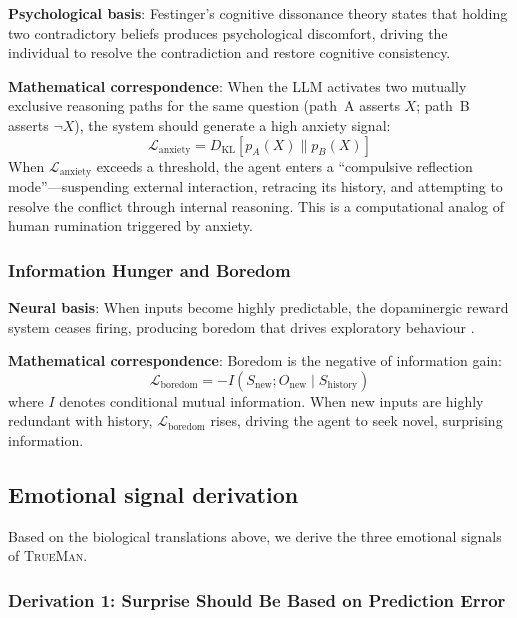 \documentclass[pdflatex,sn-mathphys-num]{sn-jnl}
\newcommand{\TrueMan}{\textsc{TrueMan}}
\theoremstyle{thmstyleone}%
\theoremstyle{thmstyletwo}%
\theoremstyle{thmstylethree}%
\begin{document}
\textbf{Psychological basis}: Festinger's cognitive dissonance theory \cite{festinger1957cognitive} states that holding two contradictory beliefs produces psychological discomfort, driving the individual to resolve the contradiction and restore cognitive consistency.

\textbf{Mathematical correspondence}: When the LLM activates two mutually exclusive reasoning paths for the same question (path~A asserts $X$; path~B asserts $\neg X$), the system should generate a high anxiety signal:
\begin{equation}\label{eq:anxiety_loss}
\mathcal{L}_{\text{anxiety}} = D_{\text{KL}}[p_A(X) \| p_B(X)]
\end{equation}
When $\mathcal{L}_{\text{anxiety}}$ exceeds a threshold, the agent enters a ``compulsive reflection mode''---suspending external interaction, retracing its history, and attempting to resolve the conflict through internal reasoning. This is a computational analog of human rumination triggered by anxiety.

\subsubsection{Information Hunger and Boredom}

\textbf{Neural basis}: When inputs become highly predictable, the dopaminergic reward system ceases firing, producing boredom that drives exploratory behaviour \cite{colas2022autotelic}.

\textbf{Mathematical correspondence}: Boredom is the negative of information gain:
\begin{equation}\label{eq:boredom_loss}
\mathcal{L}_{\text{boredom}} = -I(S_{\text{new}}; O_{\text{new}} \mid S_{\text{history}})
\end{equation}
where $I$ denotes conditional mutual information. When new inputs are highly redundant with history, $\mathcal{L}_{\text{boredom}}$ rises, driving the agent to seek novel, surprising information.

\subsection{Emotional signal derivation}\label{sec:signal_derivation}

Based on the biological translations above, we derive the three emotional signals of \TrueMan{}.

\subsubsection{Derivation 1: Surprise Should Be Based on Prediction Error}
\end{document}
